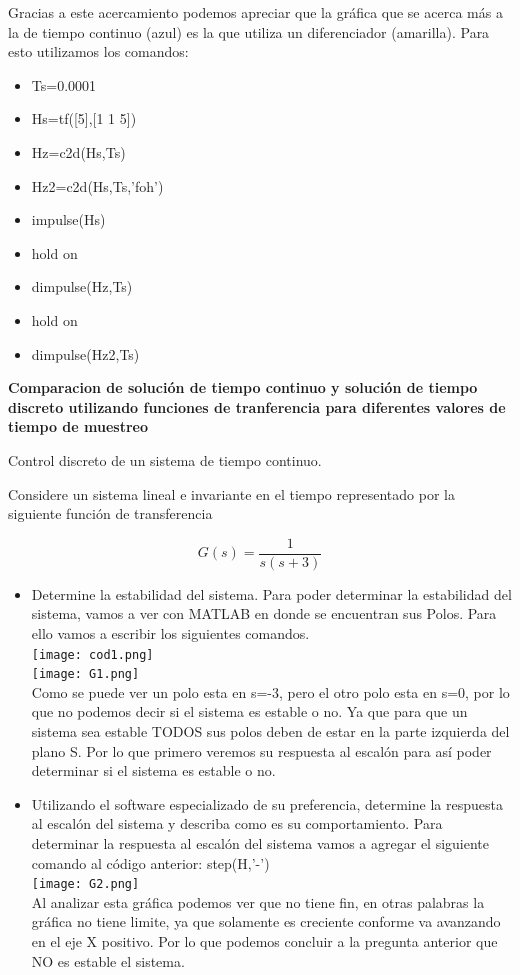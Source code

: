 Gracias a este acercamiento podemos apreciar que la gráfica que se acerca más a la de tiempo continuo (azul) es la que utiliza un diferenciador (amarilla). Para esto utilizamos los comandos:

\begin{itemize}
\item Ts=0.0001
\item Hs=tf([5],[1 1 5])
\item Hz=c2d(Hs,Ts)
\item Hz2=c2d(Hs,Ts,'foh')
\item impulse(Hs)
\item hold on
\item dimpulse(Hz,Ts)
\item hold on
\item dimpulse(Hz2,Ts)
\end{itemize}

\textbf{Comparacion de solución de tiempo continuo y solución de tiempo discreto utilizando funciones de tranferencia para diferentes valores de tiempo de muestreo }

{\Large Control discreto de un sistema de tiempo continuo.}

Considere un sistema lineal e invariante en el tiempo representado por la siguiente función de transferencia

\begin{equation*}
	G(s)=\frac{1}{s(s+3)}
\end{equation*}

\begin{itemize}
	\item Determine la estabilidad del sistema.
Para poder determinar la estabilidad del sistema, vamos a ver con MATLAB en donde se encuentran sus Polos. Para ello vamos a escribir los siguientes comandos.\\
\texttt{[image: cod1.png]}\\
\texttt{[image: G1.png]} \\
Como se puede ver un polo esta en s=-3, pero el otro polo esta en s=0, por lo que no podemos decir si el sistema es estable o no. Ya que para que un sistema sea estable TODOS sus polos deben de estar en la parte izquierda del plano S. Por lo que primero veremos su respuesta al escalón para así poder determinar si el sistema es estable o no.

	\item Utilizando el software especializado de su preferencia, determine la respuesta al escalón del sistema y describa como es su comportamiento.
Para determinar la respuesta al escalón del sistema vamos a agregar el siguiente comando al código anterior: step(H,'-')\\
\texttt{[image: G2.png]} \\
Al analizar esta gráfica podemos ver que no tiene fin, en otras palabras la gráfica no tiene limite, ya que solamente es creciente conforme va avanzando en el eje X positivo. Por lo que podemos concluir a la pregunta anterior que NO es estable el sistema.

\end{itemize}

